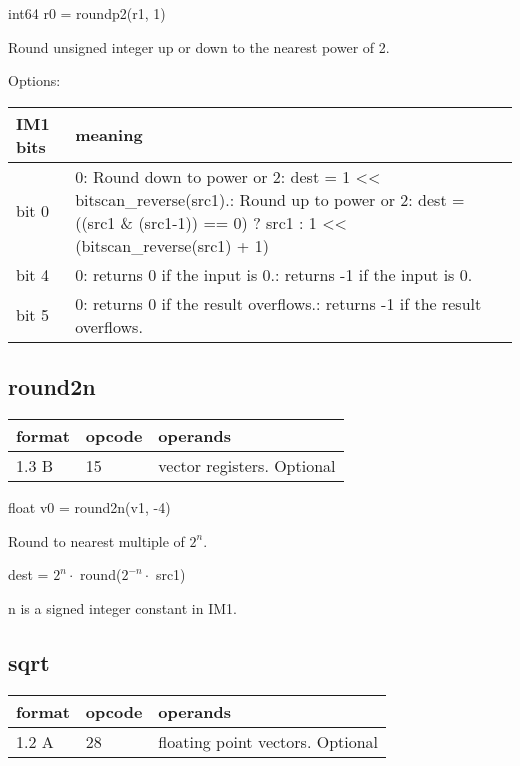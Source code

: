 \documentclass[forwardcom.tex]{subfiles}
\begin{document}
int64 r0 = roundp2(r1, 1)
\vv

Round unsigned integer up or down to the nearest power of 2. 
\vv

Options:

\label{table:roundp2Options}
\begin{tabular}{|p{16mm}|p{122mm}|}
\hline
\bfseries IM1 bits & \bfseries meaning \\ \hline
bit 0 & 0: Round down to power or 2:\newline
dest = 1 \textless\textless{} bitscan\_reverse(src1).\newline
        1: Round up to power or 2:\newline
dest = ((src1 \& (src1-1)) == 0) ? src1 : 1 \textless\textless{}  (bitscan\_reverse(src1) + 1)
\\ \hline
bit 4 & 0: returns 0 if the input is 0.\newline
        1: returns -1 if the input is 0.\\ \hline
bit 5 & 0: returns 0 if the result overflows.\newline
        1: returns -1 if the result overflows.\\ \hline        
\end{tabular}
\vv


\subsection{round2n}
\label{table:round2nInstruction}
\begin{tabular}{|p{12mm}|p{15mm}|p{100mm}|}
\hline
\bfseries format & \bfseries opcode & \bfseries operands \\ \hline
1.3 B & 15 & vector registers. Optional \\ \hline
\end{tabular}
\vv

float v0 = round2n(v1, -4)
\vv

Round to nearest multiple of $2^n$.

dest = $2^n\cdot$ round($2^{-n}\cdot$ src1)

n is a signed integer constant in IM1.
\vv


\subsection{sqrt}
\label{table:sqrtInstruction}
\begin{tabular}{|p{12mm}|p{15mm}|p{100mm}|}
\hline
\bfseries format & \bfseries opcode & \bfseries operands \\ \hline
1.2 A & 28 & floating point vectors. Optional \\ \hline
\end{tabular}
\vv
\end{document}
